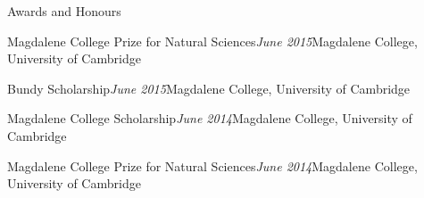 \documentclass{resume} %
\begin{document}
\begin{rSection}{Awards and Honours}
\begin{rSubsection}{Magdalene College Prize for Natural Sciences}{\em June 2015}{Magdalene College, University of Cambridge}{}
\item[]\vspace{-1.5\baselineskip}
\end{rSubsection}

\begin{rSubsection}{Bundy Scholarship}{\em June 2015}{Magdalene College, University of Cambridge}{}
\item[]\vspace{-1.5\baselineskip}
\end{rSubsection}

\begin{rSubsection}{Magdalene College Scholarship}{\em June 2014}{Magdalene College, University of Cambridge}{}
\item[]\vspace{-1.5\baselineskip}
\end{rSubsection}

\begin{rSubsection}{Magdalene College Prize for Natural Sciences}{\em June 2014}{Magdalene College, University of Cambridge}{}
\item[]\vspace{-1.5\baselineskip}
\end{rSubsection}


\end{rSection}
\end{document}
